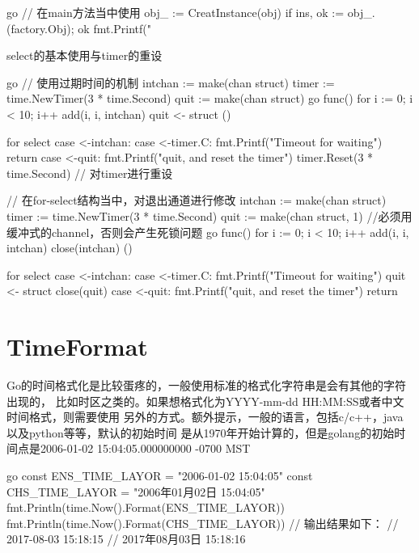 \begin{outline}[enumerate]
\begin{code-in-enumerate}{go}
// 在main方法当中使用
obj_ := CreatInstance(obj)
if ins, ok := obj_.(factory.Obj); ok {
    fmt.Printf("%
}
\end{code-in-enumerate}

  \1 select的基本使用与timer的重设

\begin{code-in-enumerate}{go}
// 使用过期时间的机制
intchan := make(chan struct{})
timer := time.NewTimer(3 * time.Second)
quit := make(chan struct{})
go func() {
    for i := 0; i < 10; i++ {
    add(i, i, intchan)
    }
    quit <- struct{}{}
}()

for {
    select {
    case <-intchan:
    case <-timer.C:
        fmt.Printf("Timeout for waiting\n")
        return
    case <-quit:
        fmt.Printf("quit, and reset the timer\n")
        timer.Reset(3 * time.Second) // 对timer进行重设
    }
}

// 在for-select结构当中，对退出通道进行修改
intchan := make(chan struct{})
timer := time.NewTimer(3 * time.Second)
quit := make(chan struct{}, 1) //必须用缓冲式的channel，否则会产生死锁问题
go func() {
    for i := 0; i < 10; i++ {
        add(i, i, intchan)
    }
    close(intchan)
}()

for {
    select {
    case <-intchan:
    case <-timer.C:
        fmt.Printf("Timeout for waiting\n")
        quit <- struct{}{}
        close(quit)
    case <-quit:
        fmt.Printf("quit, and reset the timer\n")
        return
    }
}
\end{code-in-enumerate}

\end{outline}

\section{TimeFormat}
Go的时间格式化是比较蛋疼的，一般使用标准的格式化字符串是会有其他的字符出现的，
比如时区之类的。如果想格式化为YYYY-mm-dd HH:MM:SS或者中文时间格式，则需要使用
另外的方式。额外提示，一般的语言，包括c/c++，java以及python等等，默认的初始时间
是从1970年开始计算的，但是golang的初始时间点是2006-01-02 15:04:05.000000000 -0700 MST
\begin{code-block}{go}
const ENS_TIME_LAYOR = "2006-01-02 15:04:05"
const CHS_TIME_LAYOR = "2006年01月02日 15:04:05"
fmt.Println(time.Now().Format(ENS_TIME_LAYOR))
fmt.Println(time.Now().Format(CHS_TIME_LAYOR))
// 输出结果如下：
// 2017-08-03 15:18:15
// 2017年08月03日 15:18:16
\end{code-block}

